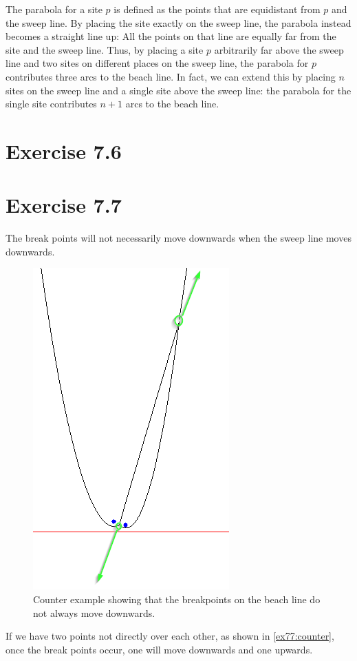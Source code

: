 \documentclass[11pt,a4paper]{article}
\begin{document}
The parabola for a site $p$ is defined as the points that are
equidistant from $p$ and the sweep line. By placing the site exactly
on the sweep line, the parabola instead becomes a straight line up:
All the points on that line are equally far from the site and the
sweep line. Thus, by placing a site $p$ arbitrarily far above the
sweep line and two sites on different places on the sweep line, the
parabola for $p$ contributes three arcs to the beach line. In fact, we
can extend this by placing $n$ sites on the sweep line and a single
site above the sweep line: the parabola for the single site
contributes $n+1$ arcs to the beach line.

\section{Exercise 7.6}


\section{Exercise 7.7}

The break points will not necessarily move downwards when the sweep line moves
downwards.

\begin{figure}[h!]
    \centering
    \includegraphics{ex77-counter}
    \caption{Counter example showing that the breakpoints on the beach line do not always move downwards.}
    \label{ex77:counter}
\end{figure}

If we have two points not directly over each other, as shown in \autoref{ex77:counter}, once the break points
occur, one will move downwards and one upwards.
\end{document}
